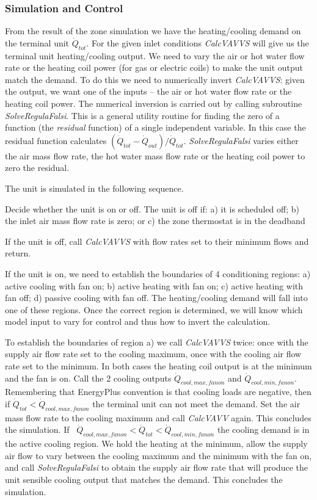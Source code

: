 \subsubsection{Simulation and Control}\label{simulation-and-control-3}

From the result of the zone simulation we have the heating/cooling demand on the terminal unit \({\dot Q_{tot}}\). For the given inlet conditions \emph{CalcVAVVS} will give us the terminal unit heating/cooling output. We need to vary the air or hot water flow rate or the heating coil power (for gas or electric coils) to make the unit output match the demand. To do this we need to numerically invert \emph{CalcVAVVS}: given the output, we want one of the inputs -- the air or hot water flow rate or the heating coil power. The numerical inversion is carried out by calling subroutine \emph{SolveRegulaFalsi}. This is a general utility routine for finding the zero of a function (the \emph{residual} function) of a single independent variable. In this case the residual function calculates \(({\dot Q_{tot}} - {\dot Q_{out}})/{\dot Q_{tot}}\). \emph{SolveRegulaFalsi} varies either the air mass flow rate, the hot water mass flow rate or the heating coil power to zero the residual.

The unit is simulated in the following sequence.

Decide whether the unit is on or off. The unit is off if: a) it is scheduled off; b) the inlet air mass flow rate is zero; or c) the zone thermostat is in the deadband

If the unit is off, call \emph{CalcVAVVS} with flow rates set to their minimum flows and return.

If the unit is on, we need to establish the boundaries of 4 conditioning regions: a) active cooling with fan on; b) active heating with fan on; c) active heating with fan off; d) passive cooling with fan off. The heating/cooling demand will fall into one of these regions. Once the correct region is determined, we will know which model input to vary for control and thus how to invert the calculation.

To establish the boundaries of region a) we call \emph{CalcVAVVS} twice: once with the supply air flow rate set to the cooling maximum, once with the cooling air flow rate set to the minimum. In both cases the heating coil output is at the minimum and the fan is on. Call the 2 cooling outputs \({\dot Q_{cool,max,fanon}}\) and \({\dot Q_{cool,min,fanon}}\). Remembering that EnergyPlus convention is that cooling loads are negative, then if \({\dot Q_{tot}} < {\dot Q_{cool,max,fanon}}\) the terminal unit can not meet the demand. Set the air mass flow rate to the cooling maximum and call \emph{CalcVAVV} again. This concludes the simulation. If~ \({\dot Q_{cool,max,fanon}} < {\dot Q_{tot}} < {\dot Q_{cool,min,fanon}}\) the cooling demand is in the active cooling region. We hold the heating at the minimum, allow the supply air flow to vary between the cooling maximum and the minimum with the fan on, and call \emph{SolveRegulaFalsi} to obtain the supply air flow rate that will produce the unit sensible cooling output that matches the demand. This concludes the simulation.


